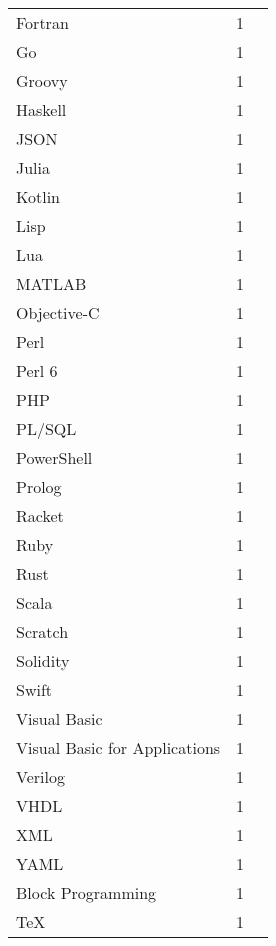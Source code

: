 \begin{table}[!htbp]
\begin{tabular}{@{}l c p{4cm}@{}}
		Fortran & 1 & \cite{kruger2024performance} \\
		Go & 1 & \cite{kruger2024performance} \\
		Groovy & 1 & \cite{kruger2024performance} \\
		Haskell & 1 & \cite{kruger2024performance} \\
		JSON & 1 & \cite{kruger2024performance} \\
		Julia & 1 & \cite{kruger2024performance} \\
		Kotlin & 1 & \cite{kruger2024performance} \\
		Lisp & 1 & \cite{kruger2024performance} \\
		Lua & 1 & \cite{kruger2024performance} \\
		MATLAB & 1 & \cite{kruger2024performance} \\
		Objective-C & 1 & \cite{kruger2024performance} \\
		Perl & 1 & \cite{kruger2024performance} \\
		Perl 6 & 1 & \cite{kruger2024performance} \\
		PHP & 1 & \cite{kruger2024performance} \\
		PL/SQL & 1 & \cite{kruger2024performance} \\
		PowerShell & 1 & \cite{kruger2024performance} \\
		Prolog & 1 & \cite{kruger2024performance} \\
		Racket & 1 & \cite{kruger2024performance} \\
		Ruby & 1 & \cite{kruger2024performance} \\
		Rust & 1 & \cite{kruger2024performance} \\
		Scala & 1 & \cite{kruger2024performance} \\
		Scratch & 1 & \cite{kruger2024performance} \\
		Solidity & 1 & \cite{kruger2024performance} \\
		Swift & 1 & \cite{kruger2024performance} \\
		Visual Basic & 1 & \cite{kruger2024performance} \\
		Visual Basic for Applications & 1 & \cite{kruger2024performance} \\
		Verilog & 1 & \cite{kruger2024performance} \\
		VHDL & 1 & \cite{kruger2024performance} \\
		XML & 1 & \cite{kruger2024performance} \\
		YAML & 1 & \cite{kruger2024performance} \\
		Block Programming & 1 & \cite{kazemitabaar2024novices} \\
		TeX & 1 & \cite{feng2024more} \\
	\bottomrule
    \end{tabular}
    \label{tab:languages}
\end{table}